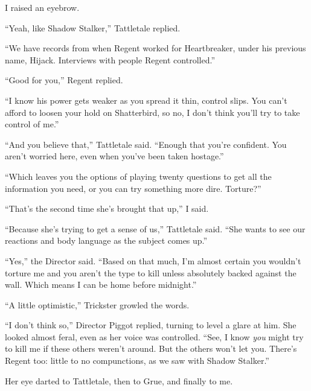 I raised an eyebrow.



``Yeah, like Shadow Stalker,'' Tattletale replied.



``We have records from when Regent worked for Heartbreaker, under his previous name, Hijack.  Interviews with people Regent controlled.''



``Good for you,'' Regent replied.



``I know his power gets weaker as you spread it thin, control slips.  You can't afford to loosen your hold on Shatterbird, so no, I don't think you'll try to take control of me.''



``And you believe that,'' Tattletale said.  ``Enough that you're confident.  You aren't worried here, even when you've been taken hostage.''



``Which leaves you the options of playing twenty questions to get all the information you need, or you can try something more dire.  Torture?''



``That's the second time she's brought that up,'' I said.



``Because she's trying to get a sense of us,'' Tattletale said.  ``She wants to see our reactions and body language as the subject comes up.''



``Yes,'' the Director said.  ``Based on that much, I'm almost certain you wouldn't torture me and you aren't the type to kill unless absolutely backed against the wall.  Which means I can be home before midnight.''



``A little optimistic,'' Trickster growled the words.



``I don't think so,'' Director Piggot replied, turning to level a glare at him.  She looked almost feral, even as her voice was controlled.  ``See, I know \emph{you }might try to kill me if these others weren't around.  But the others won't let you.  There's Regent too: little to no compunctions, as we saw with Shadow Stalker.''



Her eye darted to Tattletale, then to Grue, and finally to me.



